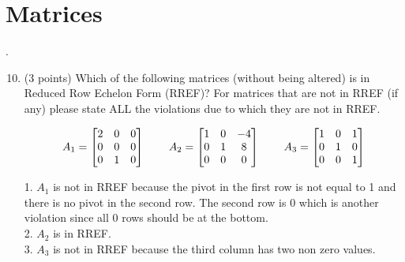 \documentclass{article}%
\begin{document}
\section*{Matrices}.
\begin{enumerate}
    \setcounter{enumi}{9}
    \item (3 points) Which of the following matrices (without being altered) is in Reduced Row Echelon Form (RREF)? For matrices that are not in RREF (if any) please state ALL the violations due to which they are not in RREF.\vspace{1ex}

    \begin{gather*}
        A_1 = 
        \begin{bmatrix}
            2 & 0 & 0\\
            0 & 0 & 0\\
            0 & 1 & 0\\
        \end{bmatrix}
        \hspace{5ex}
        A_2 =
        \begin{bmatrix}
            1 & 0 & -4\\
            0 & 1 & 8\\
            0 & 0 & 0\\
        \end{bmatrix}
        \hspace{5ex}
        A_3 =
        \begin{bmatrix}
            1 & 0 & 1\\
            0 & 1 & 0\\
            0 & 0 & 1\\
        \end{bmatrix}
    \end{gather*}


    1. $A_1$ is not in RREF because the pivot in the first row is not equal to 1 and there is no pivot in the second row. The second row is 0 which is another violation since all 0 rows should be at the bottom. \\
    2. $A_2$ is in RREF. \\
    3. $A_3$ is not in RREF because the third column has two non zero values.



\end{enumerate}
\end{document}
